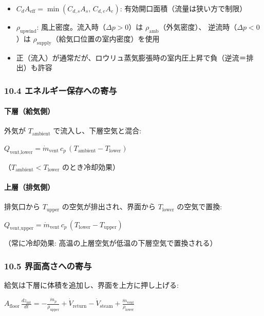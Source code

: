 \documentclass[a4paper,11pt]{article}
\begin{document}
\begin{itemize} \item $C_d A_{\text{eff}} = \min(C_{d,s} A_s, \, C_{d,e} A_e)$: 有効開口面積（流量は狭い方で制限） \end{itemize}
\begin{itemize} \item $\rho_{\text{upwind}}$: 風上密度。流入時（$\Delta p > 0$）は $\rho_{\text{amb}}$（外気密度）、
  逆流時（$\Delta p < 0$）は $\rho_{\text{supply}}$（給気口位置の室内密度）を使用 \end{itemize}
\begin{itemize} \item 正（流入）が通常だが、ロウリュ蒸気膨張時の室内圧上昇で負（逆流＝排出）も許容 \end{itemize}

\subsubsection{10.4 エネルギー保存への寄与}

\paragraph{下層（給気側）}

外気が $T_{\text{ambient}}$ で流入し、下層空気と混合:

$
Q_{\text{vent,lower}} = \dot{m}_{\text{vent}} \, c_p \, (T_{\text{ambient}} - T_{\text{lower}})
$

（$T_{\text{ambient}} < T_{\text{lower}}$ のとき冷却効果）

\paragraph{上層（排気側）}

排気口から $T_{\text{upper}}$ の空気が排出され、界面から $T_{\text{lower}}$ の空気で置換:

$
Q_{\text{vent,upper}} = \dot{m}_{\text{vent}} \, c_p \, (T_{\text{lower}} - T_{\text{upper}})
$

（常に冷却効果: 高温の上層空気が低温の下層空気で置換される）

\subsubsection{10.5 界面高さへの寄与}

給気は下層に体積を追加し、界面を上方に押し上げる:

$
A_{\text{floor}} \, \frac{dz_{\text{int}}}{dt}
= -\frac{\dot{m}_p}{\rho_{\text{upper}}} + \dot{V}_{\text{return}} - \dot{V}_{\text{steam}}
+ \frac{\dot{m}_{\text{vent}}}{\rho_{\text{lower}}}
$
\end{document}
